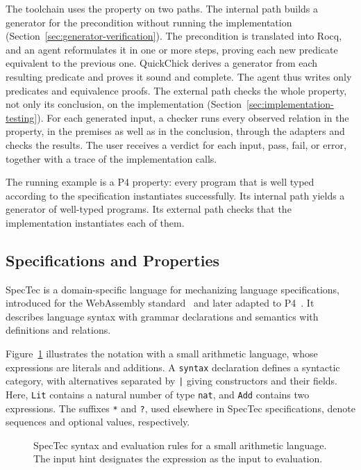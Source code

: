 The toolchain uses the property on two paths.
The internal path builds a generator for the precondition without running the
implementation (Section~\ref{sec:generator-verification}).
The precondition is translated into Rocq, and an agent reformulates it in one
or more steps, proving each new predicate equivalent to the previous one.
QuickChick derives a generator from each resulting predicate and proves it
sound and complete.
The agent thus writes only predicates and equivalence proofs.
The external path checks the whole property, not only its conclusion, on the
implementation (Section~\ref{sec:implementation-testing}).
For each generated input, a checker runs every observed relation in the
property, in the premises as well as in the conclusion, through the adapters
and checks the results.
The user receives a verdict for each input, pass, fail, or error, together with
a trace of the implementation calls.

The running example is a P4 property: every program that is well typed
according to the specification instantiates successfully.
Its internal path yields a generator of well-typed programs.
Its external path checks that the implementation instantiates each of them.

\subsection{Specifications and Properties}
\label{sec:specification-inputs}

SpecTec is a domain-specific language for mechanizing language specifications,
introduced for the WebAssembly standard~\cite{youn24spectec} and later adapted
to P4~\cite{lee26p4spectec}.
It describes language syntax with grammar declarations and semantics with
definitions and relations.

Figure~\ref{fig:spectec-syntax} illustrates the notation with a small arithmetic
language, whose expressions are literals and additions.
A \texttt{syntax} declaration defines a syntactic category, with alternatives
separated by \texttt{|} giving constructors and their fields.
Here, \texttt{Lit} contains a natural number of type \texttt{nat}, and
\texttt{Add} contains two expressions.
The suffixes \texttt{*} and \texttt{?}, used elsewhere in SpecTec specifications,
denote sequences and optional values, respectively.

\begin{figure}[ht]
  \centering
  \begin{minipage}{0.8\linewidth}
    
  \end{minipage}
  \caption{SpecTec syntax and evaluation rules for a small arithmetic language.
    The input hint designates the expression as the input to evaluation.}
  \label{fig:spectec-syntax}
\end{figure}

